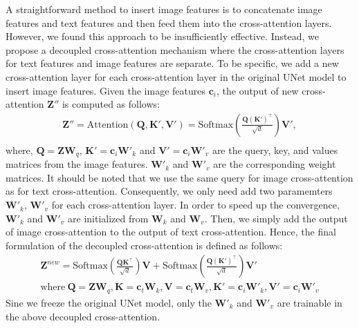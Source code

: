 \documentclass{article}
\begin{document}
A straightforward method to insert image features is to concatenate image features and text features and then feed them into the cross-attention layers. However, we found this approach to be insufficiently effective. Instead, we propose a decoupled cross-attention mechanism where the cross-attention layers for text features and image features are separate. To be specific, we add a new cross-attention layer for each cross-attention layer in the original UNet model to insert image features. Given the image features $\boldsymbol{c}_{i}$, the output of new cross-attention $\mathbf{Z}''$ is computed as follows:
\begin{equation}
    \begin{split}
    \mathbf{Z}''=\text{Attention}(\mathbf{Q},\mathbf{K}',\mathbf{V}') = \text{Softmax}(\frac{\mathbf{Q}(\mathbf{K}')^{\top}}{\sqrt{d}})\mathbf{V}',\\
    \end{split}
\end{equation}
where, $\mathbf{Q}=\mathbf{Z}\mathbf{W}_q$, $\mathbf{K}'=\boldsymbol{c}_{i}\mathbf{W}'_k$ and $\mathbf{V}'=\boldsymbol{c}_{i}\mathbf{W}'_v$ are the query, key, and values matrices from the image features. $\mathbf{W}'_k$ and $\mathbf{W}'_v$ are the corresponding weight matrices. It should be noted that we use the same query for image cross-attention as for text cross-attention. Consequently, we only need add two paramemters $\mathbf{W}'_k$, $\mathbf{W}'_v$ for each cross-attention layer. In order to speed up the convergence, $\mathbf{W}'_k$ and $\mathbf{W}'_v$ are initialized from $\mathbf{W}_k$ and $\mathbf{W}_v$.
Then, we simply add the output of image cross-attention to the output of text cross-attention. Hence, the final formulation of the decoupled cross-attention is defined as follows:
\begin{equation}
\begin{split}
\mathbf{Z}^{new}=\text{Softmax}(\frac{\mathbf{Q}\mathbf{K}^{\top}}{\sqrt{d}})\mathbf{V}+\text{Softmax}(\frac{\mathbf{Q}(\mathbf{K}')^{\top}}{\sqrt{d}})\mathbf{V}'\\
 \text{where}\ \mathbf{Q}=\mathbf{Z}\mathbf{W}_q, \mathbf{K}=\boldsymbol{c}_{t}\mathbf{W}_k, \mathbf{V}=\boldsymbol{c}_{t}\mathbf{W}_v,
 \mathbf{K}'=\boldsymbol{c}_{i}\mathbf{W}'_k, \mathbf{V}'=\boldsymbol{c}_{i}\mathbf{W}'_v
\end{split}
\end{equation}
Sine we freeze the original UNet model, only the $\mathbf{W}'_k$ and $\mathbf{W}'_v$ are trainable in the above decoupled cross-attention. 
\end{document}
